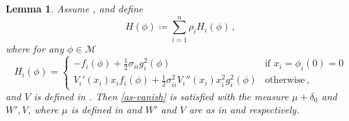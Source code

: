 \documentclass[final]{amsart}
\newtheorem{lem}[thm]{Lemma}
\numberwithin{thm}{section}
\numberwithin{equation}{section}
\newcommand{\mcM}{\mathcal{M}}
\begin{document}
\begin{lem}\label{func-vanish}
    Assume ,  and define
    \begin{equation}\label{func-H}
        H(\phi) \coloneqq \sum_{i=1}^n \rho_iH_i(\phi) \,,
    \end{equation}
   where for any $\phi \in \mcM$
   \begin{equation}
   H_i(\phi) = 
   \begin{cases}
   -f_i(\phi) + \frac{1}{2}\sigma_{ii}g_i^2(\phi) & \textrm{if }  x_i = \phi_i(0) =0 \\        
   V_i'(x_i)x_if_i(\phi) + \frac{1}{2}\sigma_{ii}^2V_i''(x_i)x_i^2g_i^2(\phi) & \textrm{otherwise} \,,
       \end{cases}
   \end{equation}
and $V$ is defined in . Then
\ref{as-vanish} is satisfied with the measure $\mu + \delta_0$ and $W', V$, where $\mu$ is defined in  and $W'$ and $V$
 are as in  and  respectively. 
\end{lem}
\end{document}
